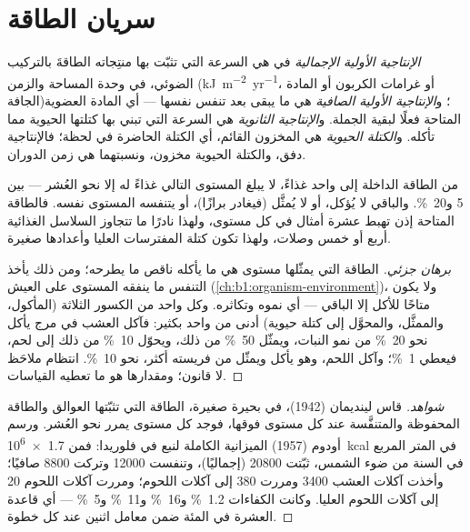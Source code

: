 \section{سريان الطاقة}

\begin{definition}[الإنتاجية]\label{def:b1:ecosystem-organization:productivity}
\emph{الإنتاجية الأولية الإجمالية} في  هي السرعة التي
تثبّت بها منتِجاته الطاقةَ بالتركيب الضوئي، في وحدة المساحة والزمن
(\unit{kJ.m^{-2}.yr^{-1}}، أو غرامات الكربون أو المادة الجافة)؛
و\emph{الإنتاجية الأولية الصافية} هي ما يبقى بعد تنفس 
نفسها --- أي المادة العضوية المتاحة فعلًا لبقية الجملة.
و\emph{الإنتاجية الثانوية} هي السرعة التي تبني بها 
كتلتها الحيوية مما تأكله. و\emph{الكتلة الحيوية} هي المخزون
القائم، أي الكتلة الحاضرة في لحظة؛ فالإنتاجية دفق، والكتلة الحيوية
مخزون، ونسبتهما هي زمن الدوران.
\end{definition}

\begin{theorem}\label{thm:b1:ecosystem-organization:lindeman}
من الطاقة الداخلة إلى  واحد غذاءً، لا يبلغ المستوى
التالي غذاءً له إلا نحو العُشر --- بين \qty{5}{} و\qty{20}{\%}.
والباقي لا يُؤكل، أو لا يُمثَّل (فيغادر برازًا)، أو يتنفسه المستوى
نفسه. فالطاقة المتاحة إذن تهبط عشرة أمثال في كل مستوى، ولهذا نادرًا
ما تتجاوز السلاسل الغذائية أربع أو خمس وصلات، ولهذا تكون كتلة
المفترسات العليا وأعدادها صغيرة.
\end{theorem}
\begin{proof}[برهان جزئي]
الطاقة التي يمثّلها مستوى هي ما يأكله ناقص ما يطرحه؛ ومن ذلك يأخذ
التنفس ما ينفقه المستوى على العيش
(\cref{ch:b1:organism-environment})، ولا يكون متاحًا للأكل إلا
الباقي --- أي نموه وتكاثره. وكل واحد من الكسور الثلاثة (المأكول،
والممثَّل، والمحوَّل إلى كتلة حيوية) أدنى من واحد بكثير: فآكل العشب
في مرج يأكل نحو \qty{20}{\%} من نمو النبات، ويمثّل \qty{50}{\%} من
ذلك، ويحوّل \qty{10}{\%} من ذلك إلى لحم، فيعطي \qty{1}{\%}؛ وآكل
اللحم، وهو يأكل ويمثّل من فريسته أكثر، نحو
\qty{10}{\%}.  انتظام ملاحَظ لا قانون؛ ومقدارها هو ما
تعطيه القياسات.
\end{proof}
\begin{proof}[شواهد]
قاس لينديمان (1942)، في بحيرة صغيرة، الطاقة التي تثبّتها العوالق
والطاقة المحفوظة والمتنفَّسة عند كل مستوى فوقها، فوجد كل مستوى
يمرر نحو العُشر. ورسم أودوم (1957) الميزانية الكاملة لنبع في
فلوريدا: فمن \qty{1.7e6}{kcal} في المتر المربع في
السنة من ضوء الشمس، ثبّتت  \num{20800} (إجماليًا)، وتنفست
\num{12000} وتركت \num{8800} صافيًا؛ وأخذت آكلات العشب \num{3400}
ومررت \num{380} إلى آكلات اللحوم؛ ومررت آكلات اللحوم
\num{20} إلى آكلات اللحوم العليا. وكانت الكفاءات \qty{1.2}{\%}
و\qty{16}{\%} و\qty{11}{\%} و\qty{5}{\%} --- أي قاعدة العشرة في المئة
ضمن معامل اثنين عند كل خطوة.
\end{proof}

